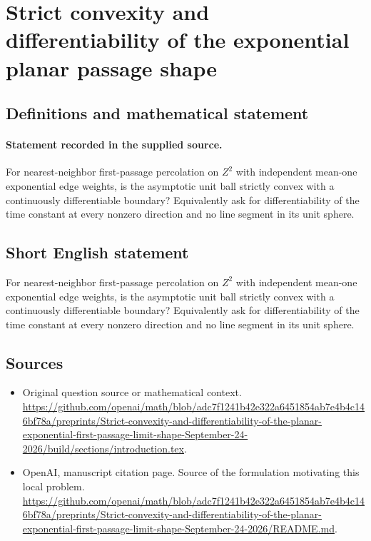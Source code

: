 \documentclass[11pt]{article}
\begin{document}
\section*{Strict convexity and differentiability of the exponential planar passage shape}\label{30007350}
\subsection{Definitions and mathematical statement}
\paragraph{Statement recorded in the supplied source.}
For nearest-neighbor first-passage percolation on $Z^2$ with independent mean-one exponential edge weights, is the asymptotic unit ball strictly convex with a continuously differentiable boundary? Equivalently ask for differentiability of the time constant at every nonzero direction and no line segment in its unit sphere.
\subsection{Short English statement}
For nearest-neighbor first-passage percolation on $Z^2$ with independent mean-one exponential edge weights, is the asymptotic unit ball strictly convex with a continuously differentiable boundary? Equivalently ask for differentiability of the time constant at every nonzero direction and no line segment in its unit sphere.
\subsection{Sources}
\begin{itemize}
\item[S1] Original question source or mathematical context.
\url{https://github.com/openai/math/blob/adc7f1241b42e322a6451854ab7e4b4c146bf78a/preprints/Strict-convexity-and-differentiability-of-the-planar-exponential-first-passage-limit-shape-September-24-2026/build/sections/introduction.tex}.
\item[S2] OpenAI, manuscript citation page. Source of the formulation motivating this local problem.
\url{https://github.com/openai/math/blob/adc7f1241b42e322a6451854ab7e4b4c146bf78a/preprints/Strict-convexity-and-differentiability-of-the-planar-exponential-first-passage-limit-shape-September-24-2026/README.md}.
\end{itemize}
\end{document}
